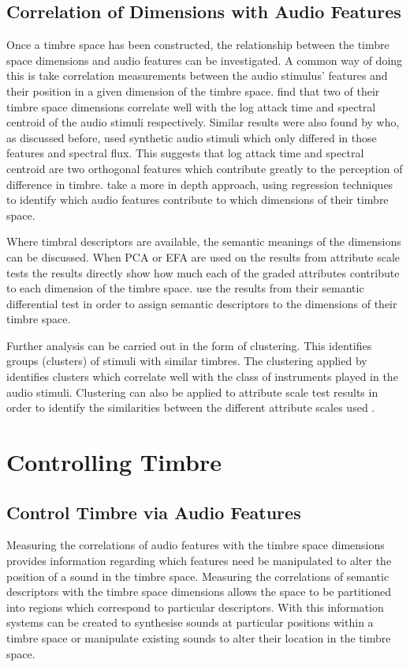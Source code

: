 	\subsection{Correlation of Dimensions with Audio Features}
	\label{sec:Timbre-DimensionalityReduction-DimensionCorrelations}
		Once a timbre space has been constructed, the relationship between the timbre space dimensions and audio
		features can be investigated. A common way of doing this is take correlation measurements between the audio
		stimulus' features and their position in a given dimension of the timbre space.
		\citet{mcadams1995perceptual} find that two of their timbre space dimensions correlate well with the log
		attack time and spectral centroid of the audio stimuli respectively. Similar results were also found by
		\citet{caclin2005acoustic} who, as discussed before, used synthetic audio stimuli which only differed in
		those features and spectral flux. This suggests that log attack time and spectral centroid are two
		orthogonal features which contribute greatly to the perception of difference in timbre.
		\citet{alluri2010exploring} take a more in depth approach, using regression techniques to identify which
		audio features contribute to which dimensions of their timbre space.

		Where timbral descriptors are available, the semantic meanings of the dimensions can be discussed. When PCA
		or EFA are used on the results from attribute scale tests the results directly show how much each of the
		graded attributes contribute to each dimension of the timbre space. \citet{marui2005timbre} use the results
		from their semantic differential test in order to assign semantic descriptors to the dimensions of their
		timbre space. 
		
		Further analysis can be carried out in the form of clustering. This identifies groups (clusters) of stimuli
		with similar timbres. The clustering applied by \citet{lakatos2000a} identifies clusters which correlate
		well with the class of instruments played in the audio stimuli. Clustering can also be applied to attribute
		scale test results in order to identify the similarities between the different attribute scales used
		\citep{zacharakis2011an2}.

\section{Controlling Timbre}
\label{sec:Timbre-Control}
	\subsection{Control Timbre via Audio Features}
	\label{sec:Timbre-Control-TimbreSpaces}
		Measuring the correlations of audio features with the timbre space dimensions provides information
		regarding which features need be manipulated to alter the position of a sound in the timbre space.
		Measuring the correlations of semantic descriptors with the timbre space dimensions allows the space to be
		partitioned into regions which correspond to particular descriptors. With this information systems can be
		created to synthesise sounds at particular positions within a timbre space or manipulate existing sounds to
		alter their location in the timbre space.

